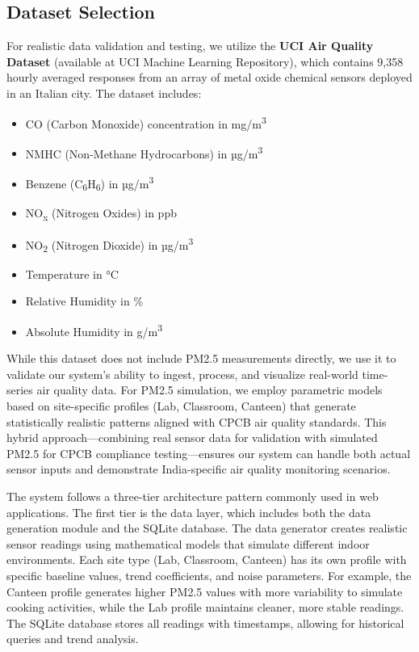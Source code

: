 \documentclass[12pt]{report}
\begin{document}
\subsection{Dataset Selection}
For realistic data validation and testing, we utilize the \textbf{UCI Air Quality Dataset} (available at UCI Machine Learning Repository), which contains 9,358 hourly averaged responses from an array of metal oxide chemical sensors deployed in an Italian city. The dataset includes:
\begin{itemize}
  \item CO (Carbon Monoxide) concentration in mg/m\textsuperscript{3}
  \item NMHC (Non-Methane Hydrocarbons) in µg/m\textsuperscript{3}
  \item Benzene (C\textsubscript{6}H\textsubscript{6}) in µg/m\textsuperscript{3}
  \item NO\textsubscript{x} (Nitrogen Oxides) in ppb
  \item NO\textsubscript{2} (Nitrogen Dioxide) in µg/m\textsuperscript{3}
  \item Temperature in °C
  \item Relative Humidity in \%
  \item Absolute Humidity in g/m\textsuperscript{3}
\end{itemize}

While this dataset does not include PM2.5 measurements directly, we use it to validate our system's ability to ingest, process, and visualize real-world time-series air quality data. For PM2.5 simulation, we employ parametric models based on site-specific profiles (Lab, Classroom, Canteen) that generate statistically realistic patterns aligned with CPCB air quality standards. This hybrid approach—combining real sensor data for validation with simulated PM2.5 for CPCB compliance testing—ensures our system can handle both actual sensor inputs and demonstrate India-specific air quality monitoring scenarios.

The system follows a three-tier architecture pattern commonly used in web applications. The first tier is the data layer, which includes both the data generation module and the SQLite database. The data generator creates realistic sensor readings using mathematical models that simulate different indoor environments. Each site type (Lab, Classroom, Canteen) has its own profile with specific baseline values, trend coefficients, and noise parameters. For example, the Canteen profile generates higher PM2.5 values with more variability to simulate cooking activities, while the Lab profile maintains cleaner, more stable readings. The SQLite database stores all readings with timestamps, allowing for historical queries and trend analysis.
\end{document}
